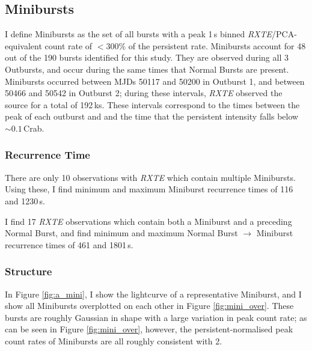 \subsection{Minibursts}

\label{sec:Minibursts}

\par I define Minibursts as the set of all bursts with a peak 1\,s binned \indexpca\textit{RXTE}/PCA-equivalent count rate of $<300\%$ of the persistent rate.  Minibursts account for 48 out of the 190 bursts identified for this study.  They are observed during all 3 Outbursts, and occur during the same times that Normal Bursts are present.  Minibursts occurred between MJDs 50117 and 50200 in Outburst 1, and between 50466 and 50542 in Outburst 2; during these intervals, \indexrxte\textit{RXTE} observed the source for a total of 192\,ks.  These intervals correspond to the times between the peak of each outburst and and the time that the persistent intensity falls below $\sim0.1$\,Crab.

\subsubsection{Recurrence Time}

\par There are only 10 observations with \indexrxte\textit{RXTE} which contain multiple Minibursts.  Using these, I find minimum and maximum Miniburst recurrence times of 116 and 1230\,s.
\par I find 17 \indexrxte\textit{RXTE} observations which contain both a Miniburst and a preceding Normal Burst, and find minimum and maximum Normal Burst $\rightarrow$ Miniburst recurrence times of 461 and 1801\,s.

\subsubsection{Structure}

\par In Figure \ref{fig:a_mini}, I show the lightcurve of a representative Miniburst, and I show all Minibursts overplotted on each other in Figure \ref{fig:mini_over}.  These bursts are roughly Gaussian in shape with a large variation in peak count rate; as can be seen in Figure \ref{fig:mini_over}, however, the persistent-normalised peak count rates of Minibursts are all roughly consistent with 2.

